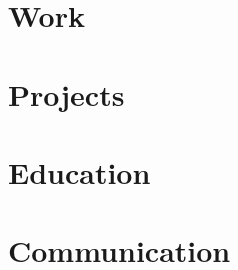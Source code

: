 \documentclass[12pt, a4paper, sans]{moderncv}
\begin{document}
\maketitle

\section{Work}

    

\section{Projects}

    

\section{Education}

    

\pagebreak

\section{Communication}

    
\end{document}
